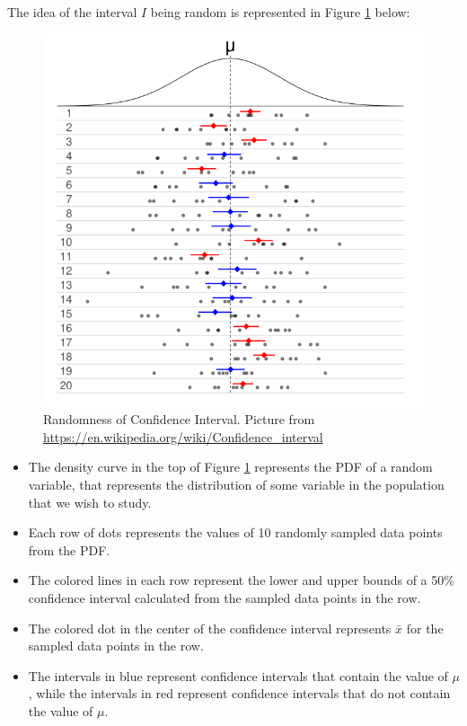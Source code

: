 \documentclass[
]{book}
\providecommand{\tightlist}{%
  \setlength{\itemsep}{0pt}\setlength{\parskip}{0pt}}
\begin{document}
The idea of the interval \(I\) being random is represented in Figure \ref{fig:8-CI} below:

\begin{figure}
\centering
\includegraphics{images/08-CI.png}
\caption{\label{fig:8-CI}Randomness of Confidence Interval. Picture from \url{https://en.wikipedia.org/wiki/Confidence_interval}}
\end{figure}

\begin{itemize}
\tightlist
\item
  The density curve in the top of Figure \ref{fig:8-CI} represents the PDF of a random variable, that represents the distribution of some variable in the population that we wish to study.
\item
  Each row of dots represents the values of 10 randomly sampled data points from the PDF.
\item
  The colored lines in each row represent the lower and upper bounds of a 50\% confidence interval calculated from the sampled data points in the row.
\item
  The colored dot in the center of the confidence interval represents \(\bar{x}\) for the sampled data points in the row.
\item
  The intervals in blue represent confidence intervals that contain the value of \(\mu\), while the intervals in red represent confidence intervals that do not contain the value of \(\mu\).
\end{itemize}
\end{document}
